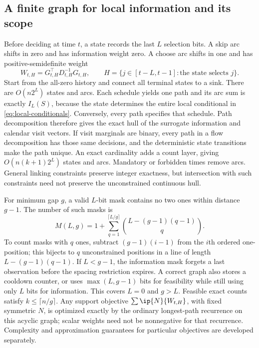 \subsection{A finite graph for local information and its scope}
\label{subsec:calendar-graph}
Before deciding at time $t$, a state records the last $L$ selection bits.
A skip arc shifts in zero and has information weight zero. A choose arc
shifts in one and has positive-semidefinite weight
\begin{equation}
 W_{t,H}=G_{t,H}^\top D_{t,H}^{-1}G_{t,H},
 \qquad H=\{j\in[t-L,t-1]:\text{the state selects }j\}.
 \label{eq:calendar-arc}
\end{equation}
Start from the all-zero history and connect all terminal states to a sink.
There are $O(n2^L)$ states and arcs. Each schedule yields one path and
its arc sum is exactly $I_L(S)$, because the state determines the entire
local conditional in \eqref{eq:local-conditionals}. Conversely, every path
specifies that schedule. Path decomposition therefore gives the exact hull
of the surrogate information and calendar visit vectors. If visit marginals
are binary, every path in a flow decomposition has those same decisions,
and the deterministic state transitions make the path unique.
An exact cardinality adds a count layer, giving
$O(n(k+1)2^L)$ states and arcs. Mandatory or forbidden times remove arcs.
General linking constraints preserve integer exactness, but intersection
with such constraints need not preserve the unconstrained continuous hull.

For minimum gap $g$, a valid $L$-bit mask contains no two ones within
distance $g-1$. The number of such masks is
\begin{equation}
 M(L,g)=1+\sum_{q=1}^{\lceil L/g\rceil}
             \binom{L-(g-1)(q-1)}{q}.
 \label{eq:separated-mask-count}
\end{equation}
To count masks with $q$ ones, subtract $(g-1)(i-1)$ from the $i$th ordered
one-position; this bijects to $q$ unconstrained positions in a line of
length $L-(g-1)(q-1)$. If $L<g-1$, the information mask forgets a last
observation before the spacing restriction expires. A correct graph also
stores a cooldown counter, or uses $\max(L,g-1)$ bits for feasibility
while still using only $L$ bits for information. This covers $L=0$ and
$g>L$. Feasible exact counts satisfy $k\le\lceil n/g\rceil$.
Any support objective $\sum\ip{N}{W_{t,H}}$, with fixed symmetric $N$,
is optimized exactly by the ordinary longest-path recurrence on this acyclic
graph; scalar weights need not be nonnegative for that recurrence. Complexity
and approximation guarantees for particular objectives are developed separately.

